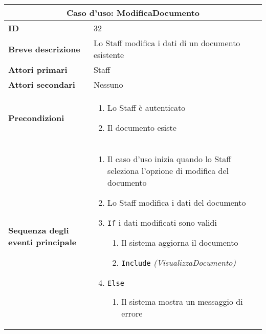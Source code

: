 \documentclass[a4paper]{report}
\begin{document}
\clearpage
\begin{table}[H]
\vspace*{-0cm}
\renewcommand{\arraystretch}{1.9}
\begin{tabular}{|p{3.9cm}|p{9.9cm}|}
\hline
\multicolumn{2}{|c|}{\textbf{Caso d’uso: ModificaDocumento}} \\ \hline
	\textbf{ID} & 32 \\ \hline
	\textbf{Breve descrizione} & Lo Staff modifica i dati di un documento esistente \\ \hline
	\textbf{Attori primari} & Staff \\ \hline
	\textbf{Attori secondari} & Nessuno \\ \hline
	\textbf{Precondizioni} & \begin{enumerate}[leftmargin=14pt,label=\arabic*.,labelsep=0.5em,topsep=0pt,partopsep=0pt,parsep=0pt,itemsep=0pt]
        \item Lo Staff è autenticato
        \item Il documento esiste
    \end{enumerate} \\ \hline
	\textbf{Sequenza degli eventi principale} & 
    \begin{enumerate}[leftmargin=14pt,label=\arabic*.,labelsep=0.5em,topsep=0pt,partopsep=0pt,parsep=0pt,itemsep=0pt]
        \item Il caso d’uso inizia quando lo Staff seleziona l'opzione di modifica del documento
        \item Lo Staff modifica i dati del documento
        \item \texttt{If} i dati modificati sono validi
        \begin{enumerate}[label=\arabic{enumi}.\arabic*.,leftmargin=22pt,labelsep=0.5em,topsep=0pt,partopsep=0pt,parsep=0pt,itemsep=0pt]
            \item Il sistema aggiorna il documento
            \item \texttt{Include} \textit{(VisualizzaDocumento)}
        \end{enumerate}
        \item \texttt{Else}
        \begin{enumerate}[label=\arabic{enumi}.\arabic*.,leftmargin=22pt,labelsep=0.5em,topsep=0pt,partopsep=0pt,parsep=0pt,itemsep=0pt]
            \item Il sistema mostra un messaggio di errore
        \end{enumerate}
    \end{enumerate}\\ \hline

\end{tabular}
\end{table}
\end{document}

